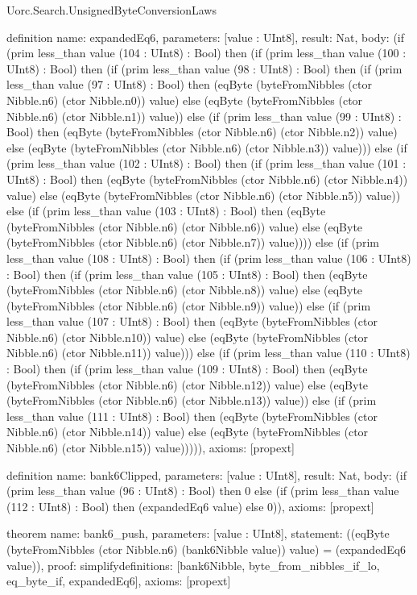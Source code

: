 \begin{lexlean}{Uorc.Search.UnsignedByteConversionLaws}
\begin{semanticmodule}
definition{
  name: expandedEq6,
  parameters: [value : UInt8],
  result: Nat,
  body: (if (prim less_than value (104 : UInt8) : Bool) then (if (prim less_than value (100 : UInt8) : Bool) then (if (prim less_than value (98 : UInt8) : Bool) then (if (prim less_than value (97 : UInt8) : Bool) then (eqByte (byteFromNibbles (ctor Nibble.n6) (ctor Nibble.n0)) value) else (eqByte (byteFromNibbles (ctor Nibble.n6) (ctor Nibble.n1)) value)) else (if (prim less_than value (99 : UInt8) : Bool) then (eqByte (byteFromNibbles (ctor Nibble.n6) (ctor Nibble.n2)) value) else (eqByte (byteFromNibbles (ctor Nibble.n6) (ctor Nibble.n3)) value))) else (if (prim less_than value (102 : UInt8) : Bool) then (if (prim less_than value (101 : UInt8) : Bool) then (eqByte (byteFromNibbles (ctor Nibble.n6) (ctor Nibble.n4)) value) else (eqByte (byteFromNibbles (ctor Nibble.n6) (ctor Nibble.n5)) value)) else (if (prim less_than value (103 : UInt8) : Bool) then (eqByte (byteFromNibbles (ctor Nibble.n6) (ctor Nibble.n6)) value) else (eqByte (byteFromNibbles (ctor Nibble.n6) (ctor Nibble.n7)) value)))) else (if (prim less_than value (108 : UInt8) : Bool) then (if (prim less_than value (106 : UInt8) : Bool) then (if (prim less_than value (105 : UInt8) : Bool) then (eqByte (byteFromNibbles (ctor Nibble.n6) (ctor Nibble.n8)) value) else (eqByte (byteFromNibbles (ctor Nibble.n6) (ctor Nibble.n9)) value)) else (if (prim less_than value (107 : UInt8) : Bool) then (eqByte (byteFromNibbles (ctor Nibble.n6) (ctor Nibble.n10)) value) else (eqByte (byteFromNibbles (ctor Nibble.n6) (ctor Nibble.n11)) value))) else (if (prim less_than value (110 : UInt8) : Bool) then (if (prim less_than value (109 : UInt8) : Bool) then (eqByte (byteFromNibbles (ctor Nibble.n6) (ctor Nibble.n12)) value) else (eqByte (byteFromNibbles (ctor Nibble.n6) (ctor Nibble.n13)) value)) else (if (prim less_than value (111 : UInt8) : Bool) then (eqByte (byteFromNibbles (ctor Nibble.n6) (ctor Nibble.n14)) value) else (eqByte (byteFromNibbles (ctor Nibble.n6) (ctor Nibble.n15)) value))))),
  axioms: [propext]
}

definition{
  name: bank6Clipped,
  parameters: [value : UInt8],
  result: Nat,
  body: (if (prim less_than value (96 : UInt8) : Bool) then 0 else (if (prim less_than value (112 : UInt8) : Bool) then (expandedEq6 value) else 0)),
  axioms: [propext]
}

theorem{
  name: bank6_push,
  parameters: [value : UInt8],
  statement: ((eqByte (byteFromNibbles (ctor Nibble.n6) (bank6Nibble value)) value) = (expandedEq6 value)),
  proof: simplify{definitions: [bank6Nibble, byte_from_nibbles_if_lo, eq_byte_if, expandedEq6]},
  axioms: [propext]
}


\end{semanticmodule}
\end{lexlean}
